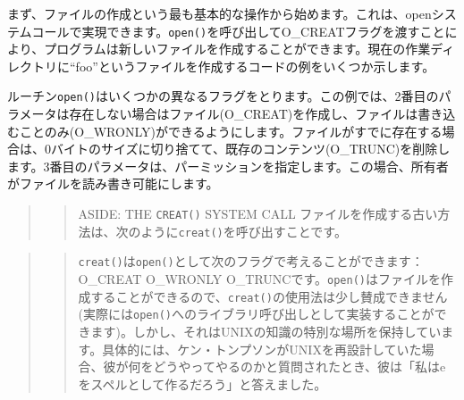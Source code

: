 まず、ファイルの作成という最も基本的な操作から始めます。これは、openシステムコールで実現できます。\texttt{open()}を呼び出してO\_CREATフラグを渡すことにより、プログラムは新しいファイルを作成することができます。現在の作業ディレクトリに``foo''というファイルを作成するコードの例をいくつか示します。

\begin{Shaded}
\begin{Highlighting}[]
\end{Highlighting}
\end{Shaded}

ルーチン\texttt{open()}はいくつかの異なるフラグをとります。この例では、2番目のパラメータは存在しない場合はファイル(O\_CREAT)を作成し、ファイルは書き込むことのみ(O\_WRONLY)ができるようにします。ファイルがすでに存在する場合は、0バイトのサイズに切り捨てて、既存のコンテンツ(O\_TRUNC)を削除します。3番目のパラメータは、パーミッションを指定します。この場合、所有者がファイルを読み書き可能にします。

\begin{quote}
\begin{quote}
ASIDE: THE \texttt{CREAT()} SYSTEM CALL
ファイルを作成する古い方法は、次のように\texttt{creat()}を呼び出すことです。
\end{quote}
\end{quote}

\begin{Shaded}
\begin{Highlighting}[]
\NormalTok{); }
\end{Highlighting}
\end{Shaded}

\begin{quote}
\begin{quote}
\texttt{creat()}は\texttt{open()}として次のフラグで考えることができます：O\_CREAT
\textbar{} O\_WRONLY \textbar{}
O\_TRUNCです。\texttt{open()}はファイルを作成することができるので、\texttt{creat()}の使用法は少し賛成できません(実際には\texttt{open()}へのライブラリ呼び出しとして実装することができます)。しかし、それはUNIXの知識の特別な場所を保持しています。具体的には、ケン・トンプソンがUNIXを再設計していた場合、彼が何をどうやってやるのかと質問されたとき、彼は「私はeをスペルとして作るだろう」と答えました。
\end{quote}
\end{quote}

